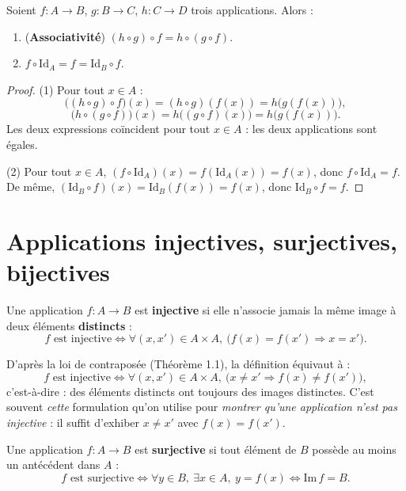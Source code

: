 \documentclass[a4paper,12pt,openany]{book}
\begin{document}
\begin{proposition}[3.2]
Soient $f:A\to B$, $g:B\to C$, $h:C\to D$ trois applications. Alors :
\begin{enumerate}
  \item (\textbf{Associativité}) $(h\circ g)\circ f = h \circ (g\circ f)$.
  \item $f \circ \mathrm{Id}_A = f = \mathrm{Id}_B \circ f$.
\end{enumerate}
\end{proposition}

\begin{proof}
(1) Pour tout $x\in A$ :
\[
\big((h\circ g)\circ f\big)(x) = (h\circ g)(f(x)) = h\big(g(f(x))\big),
\]
\[
\big(h\circ (g\circ f)\big)(x) = h\big((g\circ f)(x)\big) = h\big(g(f(x))\big).
\]
Les deux expressions coïncident pour tout $x \in A$ : les deux applications
sont égales.

(2) Pour tout $x\in A$, $(f\circ \mathrm{Id}_A)(x) = f(\mathrm{Id}_A(x)) =
f(x)$, donc $f\circ\mathrm{Id}_A=f$. De même,
$(\mathrm{Id}_B\circ f)(x)=\mathrm{Id}_B(f(x))=f(x)$, donc
$\mathrm{Id}_B\circ f = f$.
\end{proof}

\section{Applications injectives, surjectives, bijectives}


\begin{definition}[3.5 -- Injectivité]
Une application $f : A \to B$ est \textbf{injective} si elle n'associe
jamais la même image à deux éléments \textbf{distincts} :
\[
f \text{ est injective} \iff \forall (x,x') \in A\times A,\ \big(f(x)=f(x')
\Rightarrow x=x'\big).
\]
\end{definition}

\begin{remarque}
D'après la loi de contraposée (Théorème 1.1), la définition équivaut à :
\[
f \text{ est injective} \iff \forall (x,x')\in A\times A,\ \big(x\neq x'
\Rightarrow f(x)\neq f(x')\big),
\]
c'est-à-dire : des éléments distincts ont toujours des images distinctes.
C'est souvent \emph{cette} formulation qu'on utilise pour \emph{montrer
qu'une application n'est pas injective} : il suffit d'exhiber $x\neq x'$
avec $f(x)=f(x')$.
\end{remarque}

\begin{definition}[3.6 -- Surjectivité]
Une application $f : A \to B$ est \textbf{surjective} si tout élément de
$B$ possède au moins un antécédent dans $A$ :
\[
f \text{ est surjective} \iff \forall y \in B,\ \exists x \in A,\ y=f(x)
\iff \mathrm{Im}\,f = B.
\]
\end{definition}
\end{document}
